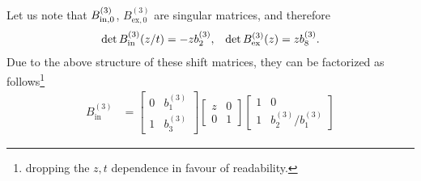 \documentclass[a4paper,reqno,11pt]{amsart}
\numberwithin{equation}{section}
\numberwithin{figure}{section}
\theoremstyle{plain}
\theoremstyle{remark}
\numberwithin{rhp}{section}
\begin{document}
Let us note that $B^{(3)}_{\text{\text{in}},0}$, $B^{(3)}_{\text{ex},0}$ are singular matrices, and therefore
\begin{align}
    \det B^{(3)}_{\text{\text{in}}}(z/t) = -z b_2^{(3)}, 
    && \det B^{(3)}_{\text{ex}}(z) = z b_8^{(3)}.
\end{align}
Due to the above structure of these shift matrices, they can be factorized as follows\footnote{dropping the $z,t$ dependence in favour of readability.}
\begin{align}
    B^{(3)}_{\text{in}} 
     &=\begin{bmatrix}
       0  & b_1^{(3)} \\
        1 & b_3^{(3)}
    \end{bmatrix} 
    \begin{bmatrix}
       z  & 0 \\
        0 & 1
    \end{bmatrix} \begin{bmatrix}
       1 & 0 \\
        1 & b_2^{(3)}/b_1^{(3)}
    \end{bmatrix}\label{B1in-fac}
\end{align}
\end{document}
